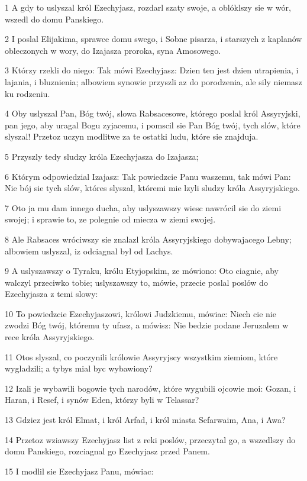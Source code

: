 \par 1 A gdy to uslyszal król Ezechyjasz, rozdarl szaty swoje, a oblóklszy sie w wór, wszedl do domu Panskiego.
\par 2 I poslal Elijakima, sprawce domu swego, i Sobne pisarza, i starszych z kaplanów obleczonych w wory, do Izajasza proroka, syna Amosowego.
\par 3 Którzy rzekli do niego: Tak mówi Ezechyjasz: Dzien ten jest dzien utrapienia, i lajania, i bluznienia; albowiem synowie przyszli az do porodzenia, ale sily niemasz ku rodzeniu.
\par 4 Oby uslyszal Pan, Bóg twój, slowa Rabsacesowe, którego poslal król Assyryjski, pan jego, aby uragal Bogu zyjacemu, i pomscil sie Pan Bóg twój, tych slów, które slyszal! Przetoz uczyn modlitwe za te ostatki ludu, które sie znajduja.
\par 5 Przyszly tedy sludzy króla Ezechyjasza do Izajasza;
\par 6 Którym odpowiedzial Izajasz: Tak powiedzcie Panu waszemu, tak mówi Pan: Nie bój sie tych slów, któres slyszal, któremi mie lzyli sludzy króla Assyryjskiego.
\par 7 Oto ja mu dam innego ducha, aby uslyszawszy wiesc nawrócil sie do ziemi swojej; i sprawie to, ze polegnie od miecza w ziemi swojej.
\par 8 Ale Rabsaces wróciwszy sie znalazl króla Assyryjskiego dobywajacego Lebny; albowiem uslyszal, iz odciagnal byl od Lachys.
\par 9 A uslyszawszy o Tyraku, królu Etyjopskim, ze mówiono: Oto ciagnie, aby walczyl przeciwko tobie; uslyszawszy to, mówie, przecie poslal poslów do Ezechyjasza z temi slowy:
\par 10 To powiedzcie Ezechyjaszowi, królowi Judzkiemu, mówiac: Niech cie nie zwodzi Bóg twój, któremu ty ufasz, a mówisz: Nie bedzie podane Jeruzalem w rece króla Assyryjskiego.
\par 11 Otos slyszal, co poczynili królowie Assyryjscy wszystkim ziemiom, które wygladzili; a tybys mial byc wybawiony?
\par 12 Izali je wybawili bogowie tych narodów, które wygubili ojcowie moi: Gozan, i Haran, i Resef, i synów Eden, którzy byli w Telassar?
\par 13 Gdziez jest król Elmat, i król Arfad, i król miasta Sefarwaim, Ana, i Awa?
\par 14 Przetoz wziawszy Ezechyjasz list z reki poslów, przeczytal go, a wszedlszy do domu Panskiego, rozciagnal go Ezechyjasz przed Panem.
\par 15 I modlil sie Ezechyjasz Panu, mówiac:
